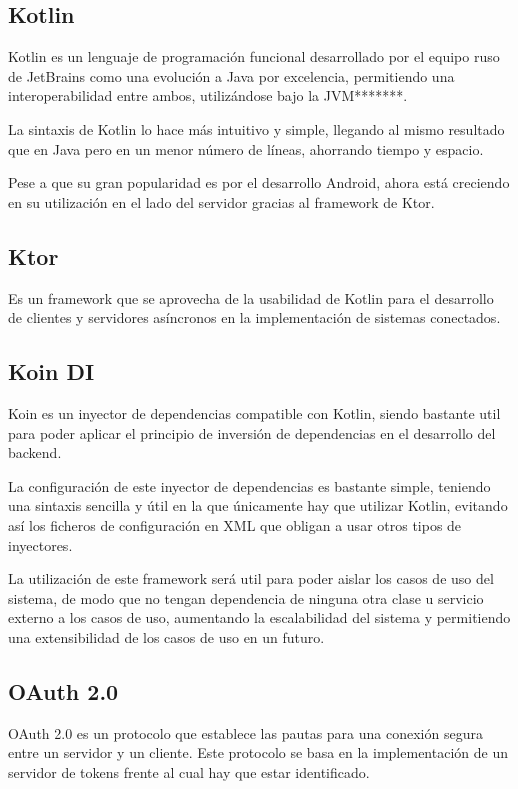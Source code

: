     \subsection{Kotlin}

Kotlin es un lenguaje de programación funcional desarrollado por el equipo ruso de JetBrains como una evolución a Java por excelencia, permitiendo una interoperabilidad entre ambos, utilizándose bajo la JVM*******.

La sintaxis de Kotlin lo hace más intuitivo y simple, llegando al mismo resultado que en Java pero en un menor número de líneas, ahorrando tiempo y espacio.

Pese a que su gran popularidad es por el desarrollo Android, ahora está creciendo en su utilización en el lado del servidor gracias al framework de Ktor. 

    \subsection{Ktor}

Es un framework que se aprovecha de la usabilidad de Kotlin para el desarrollo de clientes y servidores asíncronos en la implementación de sistemas conectados.

    \subsection{Koin DI}

Koin es un inyector de dependencias compatible con Kotlin, siendo bastante util para poder aplicar el principio de inversión de dependencias en el desarrollo del backend. 

La configuración de este inyector de dependencias es bastante simple, teniendo una sintaxis sencilla y útil en la que únicamente hay que utilizar Kotlin, evitando así los ficheros de configuración en XML que obligan a usar otros tipos de inyectores.

La utilización de este framework será util para poder aislar los casos de uso del sistema, de modo que no tengan dependencia de ninguna otra clase u servicio externo a los casos de uso, aumentando la escalabilidad del sistema y permitiendo una extensibilidad de los casos de uso en un futuro.

    \subsection{OAuth 2.0}
    
OAuth 2.0 es un protocolo que establece las pautas para una conexión segura entre un servidor y un cliente.
Este protocolo se basa en la implementación de un servidor de tokens frente al cual hay que estar identificado.

